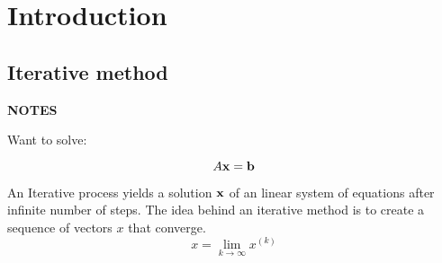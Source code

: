 \section*{Introduction}

\subsection*{Iterative method}

\textbf{NOTES}

Want to solve:

\begin{equation}
    A\mathbf{x} = \mathbf{b}
\end{equation}

An Iterative process yields a solution $\mathbf{x}$ of an linear system of
equations after infinite number of steps. The idea behind an iterative method is
to create a sequence of vectors $x$ that converge. 
\begin{equation}\label{eq:converge}
    x = \lim_{k \to \infty} x^{(k)}
\end{equation}
